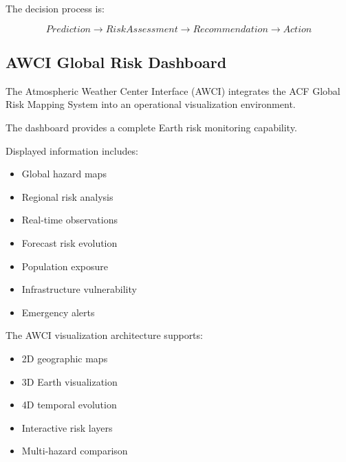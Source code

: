 The decision process is:

\[
Prediction
\rightarrow
RiskAssessment
\rightarrow
Recommendation
\rightarrow
Action
\]


\subsection{AWCI Global Risk Dashboard}

The Atmospheric Weather Center Interface (AWCI) integrates the ACF Global
Risk Mapping System into an operational visualization environment.

The dashboard provides a complete Earth risk monitoring capability.

Displayed information includes:

\begin{itemize}

\item Global hazard maps

\item Regional risk analysis

\item Real-time observations

\item Forecast risk evolution

\item Population exposure

\item Infrastructure vulnerability

\item Emergency alerts

\end{itemize}


The AWCI visualization architecture supports:

\begin{itemize}

\item 2D geographic maps

\item 3D Earth visualization

\item 4D temporal evolution

\item Interactive risk layers

\item Multi-hazard comparison

\end{itemize}


